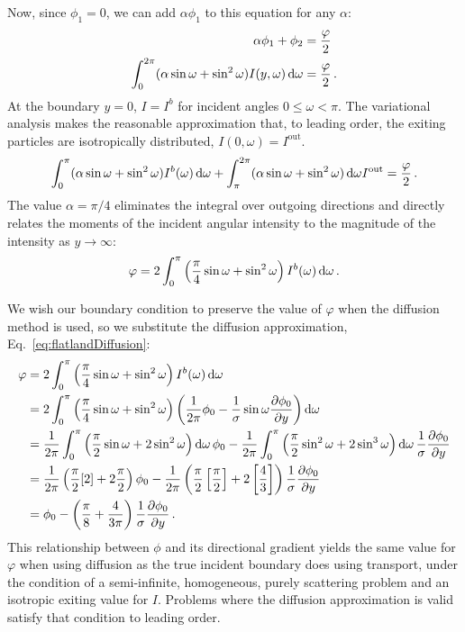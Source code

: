 Now, since $\phi_1=0$, we can add $\alpha \phi_1$ to this equation for any
$\alpha$:
\begin{align*}
 \alpha\phi_1 + \phi_{2} &= \frac{\varphi}{2} \\
 \int_{0}^{2\pi} (\alpha \sin\omega + \sin^2\omega)
 I(y,\omega) \mathop{}\!\mathrm{d}\omega
 &= \frac{\varphi}{2}\,.
\end{align*}
At the boundary $y=0$, $I=I^b$ for incident angles $0 \le \omega < \pi$. The
variational analysis makes the reasonable approximation that, to leading order,
the exiting particles are isotropically distributed, $I(0,\omega)=I^\text{out}$.
\begin{equation*}
 \int_{0}^{\pi} (\alpha \sin\omega + \sin^2\omega)
 I^b(\omega) \mathop{}\!\mathrm{d}\omega
 + \int_{\pi}^{2\pi} (\alpha \sin\omega + \sin^2\omega)\mathop{}\!\mathrm{d}\omega I^\text{out}
 = \frac{\varphi}{2}\,.
\end{equation*}
The value $\alpha=\pi/4$ eliminates the integral over outgoing directions and
directly relates the moments of the incident angular intensity to the
magnitude of the intensity as $y\to\infty$:
\begin{equation}\label{eq:varBoundary}
 \varphi = 2\int_{0}^{\pi} \left( \frac{\pi}{4} \sin\omega + \sin^2\omega \right)
 I^b(\omega) \mathop{}\!\mathrm{d}\omega
 \,.
\end{equation}

We wish our boundary condition to preserve the value of
$\varphi$ when the diffusion method is used, so we substitute the diffusion
approximation, Eq.~\eqref{eq:flatlandDiffusion}:
\begin{align*}
 \varphi &= 2\int_{0}^{\pi} \left( \frac{\pi}{4} \sin\omega + \sin^2\omega \right)
 I^b(\omega) \mathop{}\!\mathrm{d}\omega
 \\
 &= 
  2\int_{0}^{\pi} \left( \frac{\pi}{4} \sin\omega + \sin^2\omega \right)
 \left( \frac{1}{2\pi} \phi_0 -
  \frac{1}{\sigma} \sin\omega \frac{\partial \phi_0}{\partial y}\right)\mathop{}\!\mathrm{d}\omega
\\
 &= 
\frac{1}{2\pi} \int_{0}^{\pi} \left( \frac{\pi}{2} \sin\omega + 2 \sin^2\omega
\right)\mathop{}\!\mathrm{d}\omega
 \,\phi_0 -
 \frac{1}{2\pi} \int_{0}^{\pi} \left( \frac{\pi}{2} \sin^2\omega + 2 \sin^3\omega \right)\mathop{}\!\mathrm{d}\omega
  \,\frac{1}{\sigma} \frac{\partial \phi_0}{\partial y}
  \\
 &= 
 \frac{1}{2\pi} \left( \frac{\pi}{2} [2] + 2 \frac{\pi}{2}
\right) \phi_0
-
\frac{1}{2\pi} \left( \frac{\pi}{2} \left[ \frac{\pi}{2} \right] + 2 \left[
\frac{4}{3} \right] \right) \frac{1}{\sigma} \frac{\partial \phi_0}{\partial y}
\\
 &= 
  \phi_0
- \left( \frac{\pi}{8} + \frac{4}{3\pi} \right) \frac{1}{\sigma} \frac{\partial \phi_0}{\partial y}
\,.
\end{align*}
This relationship between $\phi$ and its directional gradient yields the same
value for $\varphi$ when using diffusion as the true incident boundary does
using transport, under the condition of a semi-infinite, homogeneous, purely
scattering problem and an isotropic exiting value for $I$. Problems where the
diffusion approximation is valid satisfy that condition to leading order.

